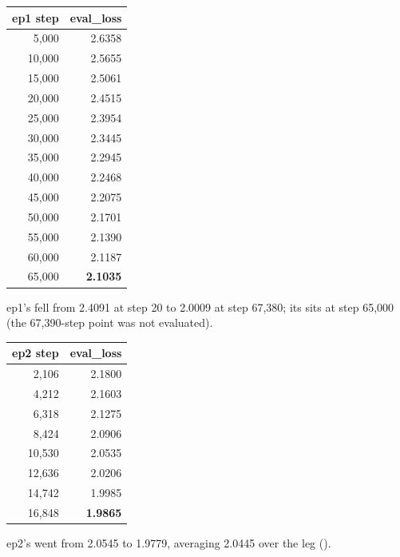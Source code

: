 \documentclass[11pt,openany]{article}
\begin{document}
\begin{center}\small
{}
\begin{tabular}{@{}rr@{}}
\toprule
\textbf{ep1 step} & \textbf{eval\_loss} \\
\midrule
5{,}000 & 2.6358 \\
10{,}000 & 2.5655 \\
15{,}000 & 2.5061 \\
20{,}000 & 2.4515 \\
25{,}000 & 2.3954 \\
30{,}000 & 2.3445 \\
35{,}000 & 2.2945 \\
40{,}000 & 2.2468 \\
45{,}000 & 2.2075 \\
50{,}000 & 2.1701 \\
55{,}000 & 2.1390 \\
60{,}000 & 2.1187 \\
65{,}000 & \textbf{2.1035} \\
\bottomrule
\end{tabular}
\end{center}

ep1's  fell from 2.4091 at step 20 to 2.0009 at step 67{,}380; its
 sits at step 65{,}000 (the 67{,}390-step point was not evaluated).

\begin{center}\small
{}
\begin{tabular}{@{}rr@{}}
\toprule
\textbf{ep2 step} & \textbf{eval\_loss} \\
\midrule
2{,}106 & 2.1800 \\
4{,}212 & 2.1603 \\
6{,}318 & 2.1275 \\
8{,}424 & 2.0906 \\
10{,}530 & 2.0535 \\
12{,}636 & 2.0206 \\
14{,}742 & 1.9985 \\
16{,}848 & \textbf{1.9865} \\
\bottomrule
\end{tabular}
\end{center}

ep2's  went from 2.0545 to 1.9779, averaging 2.0445 over the leg
().
\end{document}
